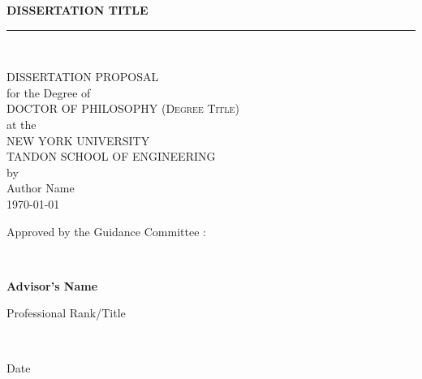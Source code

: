 \newcommand{\HRule}{\rule{8cm}{0.5mm}} 

\begin{titlepage}
\begin{center}

\sffamily
\bfseries
\LARGE{DISSERTATION TITLE} \\
\vspace{-0.5cm}
\HRule \\
\large

\textsc{
\textrm{
DISSERTATION PROPOSAL}}\\

\mdseries
{for the Degree of} \\[-0.25cm]
\textsc{
\textrm{
DOCTOR OF PHILOSOPHY (Degree Title)}} \\[-0.25cm]
at the \\[-0.25cm]
\textsc{
\textrm{
NEW YORK UNIVERSITY \\
\setlength{\parskip}{-1em}
TANDON SCHOOL OF ENGINEERING}} \\[0.5cm]

by \\
\textrm{
\large{
Author Name}} \\[-0.25cm]

\textrm{
\large{
{\today}}}

\end{center}

\small
\vspace{1.5cm}
Approved by the Guidance Committee :
\vspace{0.5cm}


\hspace{4.5cm} \hrulefill\

\vspace{-0.5cm}

\hspace{4.5cm} 
\textbf{Advisor's Name}

\vspace{-.5cm}

\hspace{4.5cm} Professional Rank/Title

\vspace{-0.25cm}

\hspace{4.5cm} \hrulefill\

\vspace{-0.5cm}

\hspace{4.5cm}
Date


\end{titlepage}
